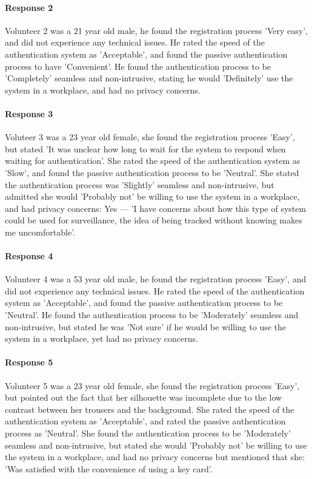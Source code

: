 \paragraph{Response 2} Volunteer 2 was a 21 year old male, he found the registration process 'Very easy', and did not experience any technical issues.
He rated the speed of the authentication system as 'Acceptable', and found the passive authentication process to have 'Convenient'.
He found the authentication process to be 'Completely' seamless and non-intrusive, stating he would 'Definitely' use the system in a workplace, and had no privacy concerns.

\paragraph{Response 3} Voluteer 3 was a 23 year old female, she found the registration process 'Easy', but stated 'It was unclear how long to wait for the system to respond when waiting for authentication'.
She rated the speed of the authentication system as 'Slow', and found the passive authentication process to be 'Neutral'.
She stated the authentication process was 'Slightly' seamless and non-intrusive, but admitted she would 'Probably not' be willing to use the system in a workplace, and had privacy concerns: Yes --- 'I have concerns about how this type of system could be used for surveillance, the idea of being tracked without knowing makes me uncomfortable'.

\paragraph{Response 4} Volunteer 4 was a 53 year old male, he found the registration process 'Easy', and did not experience any technical issues.
He rated the speed of the authentication system as 'Acceptable', and found the passive authentication process to be 'Neutral'.
He found the authentication process to be 'Moderately' seamless and non-intrusive, but stated he was 'Not sure' if he would be willing to use the system in a workplace, yet had no privacy concerns.

\paragraph{Response 5} Volunteer 5 was a 23 year old female, she found the registration process 'Easy', but pointed out the fact that her silhouette was incomplete due to the low contrast between her trousers and the background.
She rated the speed of the authentication system as 'Acceptable', and rated the passive authentication process as 'Neutral'.
She found the authentication process to be 'Moderately' seamless and non-intrusive, but stated she would 'Probably not' be willing to use the system in a workplace, and had no privacy concerns but mentioned that she: 'Was satisfied with the convenience of using a key card'.

